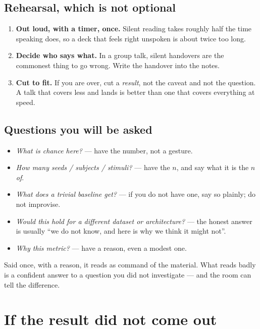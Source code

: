 \documentclass[11pt]{article}
\begin{document}
\subsection{Rehearsal, which is not optional}

\begin{enumerate}
  \item \textbf{Out loud, with a timer, once.} Silent reading takes roughly half
        the time speaking does, so a deck that feels right unspoken is about
        twice too long.
  \item \textbf{Decide who says what.} In a group talk, silent handovers are the
        commonest thing to go wrong. Write the handover into the notes.
  \item \textbf{Cut to fit.} If you are over, cut a \emph{result}, not the caveat
        and not the question. A talk that covers less and lands is better than
        one that covers everything at speed.
\end{enumerate}

\subsection{Questions you will be asked}

\begin{itemize}
  \item \emph{What is chance here?} --- have the number, not a gesture.
  \item \emph{How many seeds / subjects / stimuli?} --- have the $n$, and say what
        it is the $n$ \emph{of}.
  \item \emph{What does a trivial baseline get?} --- if you do not have one, say
        so plainly; do not improvise.
  \item \emph{Would this hold for a different dataset or architecture?} --- the
        honest answer is usually ``we do not know, and here is why we think it
        might not''.
  \item \emph{Why this metric?} --- have a reason, even a modest one.
\end{itemize}

\begin{keybox}
 Said once, with a reason, it reads as
command of the material. What reads badly is a confident answer to a question you
did not investigate --- and the room can tell the difference.
\end{keybox}

\section{If the result did not come out}
\end{document}
